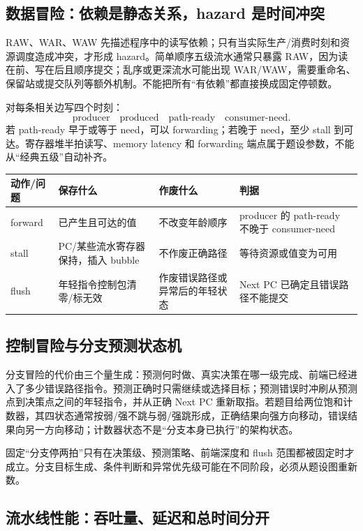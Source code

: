 \documentclass[UTF8,fontset=fandol,11pt,a4paper]{ctexart}
\begin{document}
\subsection{数据冒险：依赖是静态关系，hazard 是时间冲突}

RAW、WAR、WAW 先描述程序中的读写依赖；只有当实际生产/消费时刻和资源调度造成冲突，才形成 hazard。简单顺序五级流水通常只暴露 RAW，因为读在前、写在后且顺序提交；乱序或更深流水可能出现 WAR/WAW，需要重命名、保留站或提交队列等额外机制。不能把所有“有依赖”都直接换成固定停顿数。

对每条相关边写四个时刻：
\[
\text{producer}\quad\text{produced}\quad\text{path-ready}\quad\text{consumer-need}.
\]
若 path-ready 早于或等于 need，可以 forwarding；若晚于 need，至少 stall 到可达。寄存器堆半拍读写、memory latency 和 forwarding 端点属于题设参数，不能从“经典五级”自动补齐。

\begin{center}\small
\begin{tabularx}{\linewidth}{L{2.0cm}L{3.0cm}L{3.0cm}Y}
\toprule
动作/问题 & 保存什么 & 作废什么 & 判据 \\
\midrule
forward & 已产生且可达的值 & 不改变年龄顺序 & producer 的 path-ready 不晚于 consumer-need \\
stall & PC/某些流水寄存器保持，插入 bubble & 不作废正确路径 & 等待资源或值变为可用 \\
flush & 年轻指令控制包清零/标无效 & 作废错误路径或异常后的年轻状态 & Next PC 已确定且错误路径不能提交 \\
\bottomrule
\end{tabularx}
\end{center}

\subsection{控制冒险与分支预测状态机}

分支冒险的代价由三个量生成：预测何时做、真实决策在哪一级完成、前端已经进入了多少错误路径指令。预测正确时只需继续或选择目标；预测错误时冲刷从预测点到决策点之间的年轻指令，并从正确 Next PC 重新取指。若题目给两位饱和计数器，其四状态通常按弱/强不跳与弱/强跳形成，正确结果向强方向移动，错误结果向另一方向移动；计数器状态不是“分支本身已执行”的架构状态。

固定“分支停两拍”只有在决策级、预测策略、前端深度和 flush 范围都被固定时才成立。分支目标生成、条件判断和异常优先级可能在不同阶段，必须从题设图重新数。

\subsection{流水线性能：吞吐量、延迟和总时间分开}
\end{document}
